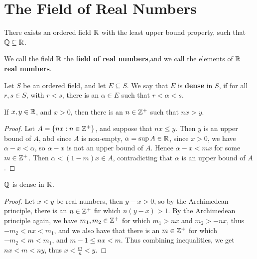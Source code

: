 \section{The Field of Real Numbers}\label{secton_1.3}

\begin{theorem}\label{theorem_1.3.1}
  There exists an ordered field $\mathbb{R}$ with the least upper bound property, such
  that $\mathbb{Q} \subseteq \mathbb{R}$.
\end{theorem}

\begin{definition}
  We call the field $\mathbb{R}$ the \textbf{field of real numbers},and we call the
  elements of $\mathbb{R}$ \textbf{real numbers}.
\end{definition}

\begin{definition}
  Let $S$ be an ordered field, and let  $E \subseteq S$. We say that  $E$ is
  \textbf{dense} in $S$, if for all $r,s \in S$, with $r<s$, there is an $\alpha
  \in E$ such that $r<\alpha<s$.
\end{definition}

\begin{theorem}\label{theorem_1.3.2}
  If $x,y \in \mathbb{R}$, and  $x>0$, then there is an  $n \in \mathbb{Z}^+$ such that
  $nx>y$.
\end{theorem}
\begin{proof}
  Let $A=\{nx: n \in \mathbb{Z}^+\}$, and suppose that  $nx \leq y$. Then  $y$ is an
  upper bound of $A$, abd since  $A$ is non-empty,  $\alpha=\sup{A} \in \mathbb{R}$,
  since $x>0$, we have $\alpha-x<\alpha$, so  $\alpha-x$ is not an upper bound of
  $A$. Hence  $\alpha-x<mx$ for some $m \in \mathbb{Z}^+$. Then  $\alpha<(1-m)x \in A$,
  contradicting that  $\alpha$ is an upper bound of  $A$.
\end{proof}

\begin{theorem}\label{theorem_1.3.3}
  $\mathbb{Q}$ is dense in  $\mathbb{R}$.
\end{theorem}
\begin{proof}
  Let $x<y$ be real numbers, then  $y-x>0$, so by the Archimedean principle,
  there is an $n \in \mathbb{Z}^+$ fir which $n(y-x)>1$. By the Archimedean principle
  again, we have $m_1,m_2 \in \mathbb{Z}^+$ for which $m_1>nx$ and $m_2>-nx$, thus
  $-m_2<nx<m_1$, and we also have that there is an $m \in \mathbb{Z}^+$ for which
  $-m_2<m<m_1$, and $m-1 \leq nx<m$. Thus combining inequalities, we get
  $nx<m<ny$, thus  $x<\frac{m}{n}<y$.
\end{proof}

